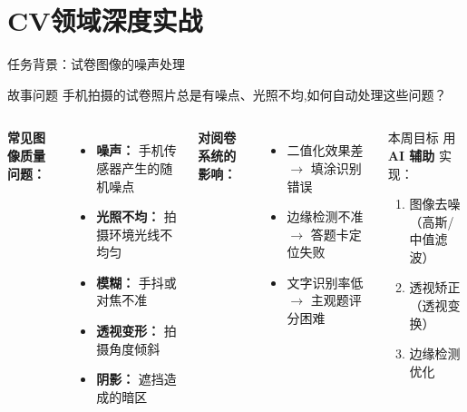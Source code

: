 
\section{CV领域深度实战}


\begin{frame}{任务背景：试卷图像的噪声处理}
	\begin{block}{故事问题}
		手机拍摄的试卷照片总是有噪点、光照不均,如何自动处理这些问题？
	\end{block}

	\vspace{0.3cm}

	\begin{columns}
		\textbf{常见图像质量问题：}
		\begin{itemize}
			\item \textbf{噪声：} 手机传感器产生的随机噪点
			\item \textbf{光照不均：} 拍摄环境光线不均匀
			\item \textbf{模糊：} 手抖或对焦不准
			\item \textbf{透视变形：} 拍摄角度倾斜
			\item \textbf{阴影：} 遮挡造成的暗区
		\end{itemize}

		\textbf{对阅卷系统的影响：}
		\begin{itemize}
			\item 二值化效果差 $\rightarrow$ 填涂识别错误
			\item 边缘检测不准 $\rightarrow$ 答题卡定位失败
			\item 文字识别率低 $\rightarrow$ 主观题评分困难
		\end{itemize}

		\vspace{0.3cm}

		\begin{exampleblock}{本周目标}
			用 \textbf{AI 辅助} 实现：
			\begin{enumerate}
				\item 图像去噪（高斯/中值滤波）
				\item 透视矫正（透视变换）
				\item 边缘检测优化
			\end{enumerate}
		\end{exampleblock}
	\end{columns}
\end{frame}

